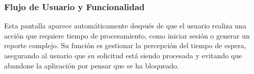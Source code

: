 \begin{samepage}
	\subsubsection*{Flujo de Usuario y Funcionalidad}
	Esta pantalla aparece automáticamente después de que el usuario realiza una acción que requiere tiempo de procesamiento, como iniciar sesión o generar un reporte complejo. Su función es gestionar la percepción del tiempo de espera, asegurando al usuario que su solicitud está siendo procesada y evitando que abandone la aplicación por pensar que se ha bloqueado.
\normalsize\end{samepage}